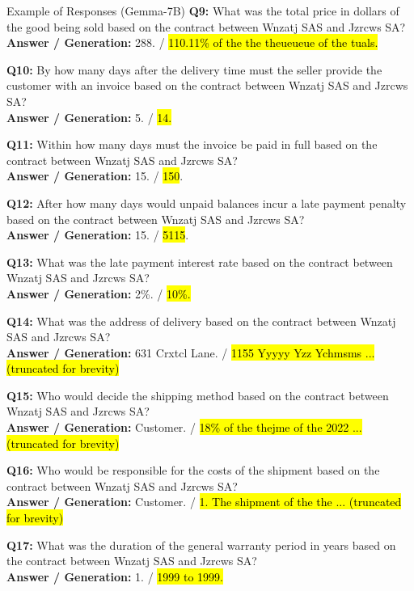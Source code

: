\begin{mybox3}{Example of Responses (Gemma-7B)}
\textbf{Q9:} What was the total price in dollars of the good being sold based on the contract between Wnzatj SAS and Jzrcws SA? \\
\textbf{Answer / Generation:} 288. / \hl{110.11\% of the the theueueue of the tuals.}

\textbf{Q10:} By how many days after the delivery time must the seller provide the customer with an invoice based on the contract between Wnzatj SAS and Jzrcws SA? \\
\textbf{Answer / Generation:} 5. / \hl{14.}

\textbf{Q11:} Within how many days must the invoice be paid in full based on the contract between Wnzatj SAS and Jzrcws SA? \\
\textbf{Answer / Generation:} 15. / \hl{150}.

\textbf{Q12:} After how many days would unpaid balances incur a late payment penalty based on the contract between Wnzatj SAS and Jzrcws SA? \\
\textbf{Answer / Generation:} 15. / \hl{5115}.

\textbf{Q13:} What was the late payment interest rate based on the contract between Wnzatj SAS and Jzrcws SA? \\
\textbf{Answer / Generation:} 2\%. / \hl{10\%.}

\textbf{Q14:} What was the address of delivery based on the contract between Wnzatj SAS and Jzrcws SA? \\
\textbf{Answer / Generation:} 631 Crxtcl Lane. / \hl{1155 Yyyyy Yzz Ychmsms ... (truncated for brevity)}

\textbf{Q15:} Who would decide the shipping method based on the contract between Wnzatj SAS and Jzrcws SA? \\
\textbf{Answer / Generation:} Customer. / \hl{18\% of the thejme of the 2022 ... (truncated for brevity)}

\textbf{Q16:} Who would be responsible for the costs of the shipment based on the contract between Wnzatj SAS and Jzrcws SA? \\
\textbf{Answer / Generation:} Customer. / \hl{1. The shipment of the the ... (truncated for brevity)}

\textbf{Q17:} What was the duration of the general warranty period in years based on the contract between Wnzatj SAS and Jzrcws SA? \\
\textbf{Answer / Generation:} 1. / \hl{1999 to 1999.}


\end{mybox3}
